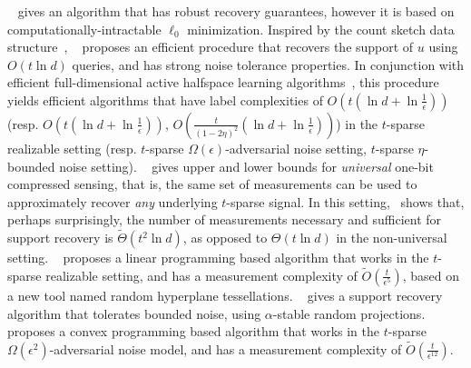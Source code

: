 ~\cite{JLBB13} gives an algorithm that has robust recovery guarantees, however it is based on computationally-intractable $\ell_0$ minimization. Inspired by the count sketch data structure~\citep{CCF02}, ~\cite{HB11} proposes an efficient procedure that recovers the support of $u$ using $O(t \ln d)$ queries, and has strong noise tolerance properties. In conjunction with efficient full-dimensional active halfspace learning algorithms~\citep{DKM05,ABL17,CHK17,YZ17}, this procedure
 yields efficient algorithms that have label complexities of $O(t (\ln d + \ln \frac 1 \epsilon ))$
(resp. $O(t (\ln d + \ln \frac 1 \epsilon))$, $O(\frac{t}{(1-2\eta)^2} (\ln d + \ln \frac 1 \epsilon ))$) in the $t$-sparse realizable setting (resp. $t$-sparse $\Omega(\epsilon)$-adversarial noise setting, $t$-sparse $\eta$-bounded noise setting).
~\cite{GNJN13, ABK17} gives upper and lower bounds for {\em universal} one-bit compressed sensing, that is, the same set of measurements can be used to approximately recover {\em any} underlying $t$-sparse signal. In this setting,~\cite{ABK17} shows that, perhaps surprisingly, the number of measurements necessary and sufficient for support recovery is $\tilde{\Theta}(t^2 \ln d)$, as opposed to $\Theta(t \ln d)$ in the non-universal setting.
 ~\cite{PV13a} proposes a linear programming based algorithm that works in the $t$-sparse realizable setting, and has a measurement complexity of $\tilde{O}(\frac{t}{\epsilon^5})$,
based on a new tool named random hyperplane tessellations. ~\cite{L16} gives a support recovery algorithm that tolerates bounded noise, %
using $\alpha$-stable random projections.
\cite{PV13b} proposes a convex programming based algorithm that works in the $t$-sparse $\Omega(\epsilon^2)$-adversarial noise model,
and has a measurement complexity of $\tilde{O}(\frac{t}{\epsilon^{12}})$.


